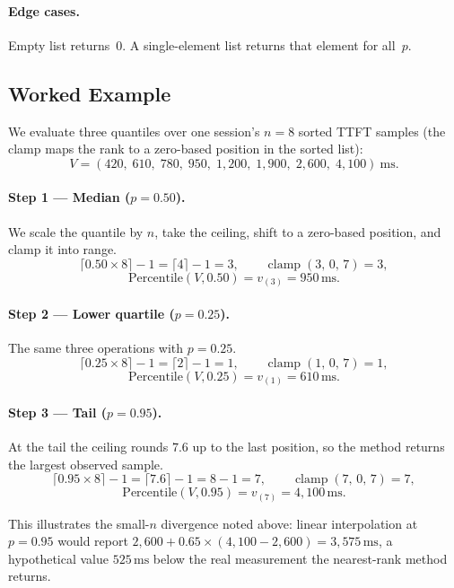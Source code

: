 \documentclass[11pt,a4paper]{article}
\newcommand{\clamp}[3]{\operatorname{clamp}\!\left(#1,\,#2,\,#3\right)}
\begin{document}
\paragraph{Edge cases.}
Empty list returns~0.  A single-element list returns that element for all~$p$.

\subsection{Worked Example}
\label{sec:percentile-example}

We evaluate three quantiles over one session's $n = 8$ sorted TTFT
samples (the clamp maps the rank to a zero-based position in the sorted
list):
\[
  V = (420,\; 610,\; 780,\; 950,\; 1{,}200,\; 1{,}900,\; 2{,}600,\; 4{,}100)\ \text{ms}.
\]

\paragraph{Step 1 --- Median ($p = 0.50$).}
We scale the quantile by $n$, take the ceiling, shift to a zero-based
position, and clamp it into range.
\[
  \lceil 0.50 \times 8 \rceil - 1 = \lceil 4 \rceil - 1 = 3,
  \qquad
  \clamp{3}{0}{7} = 3,
\]
\[
  \text{Percentile}(V, 0.50) = v_{(3)} = 950\,\text{ms}.
\]

\paragraph{Step 2 --- Lower quartile ($p = 0.25$).}
The same three operations with $p = 0.25$.
\[
  \lceil 0.25 \times 8 \rceil - 1 = \lceil 2 \rceil - 1 = 1,
  \qquad
  \clamp{1}{0}{7} = 1,
\]
\[
  \text{Percentile}(V, 0.25) = v_{(1)} = 610\,\text{ms}.
\]

\paragraph{Step 3 --- Tail ($p = 0.95$).}
At the tail the ceiling rounds $7.6$ up to the last position, so the
method returns the largest observed sample.
\[
  \lceil 0.95 \times 8 \rceil - 1 = \lceil 7.6 \rceil - 1 = 8 - 1 = 7,
  \qquad
  \clamp{7}{0}{7} = 7,
\]
\[
  \text{Percentile}(V, 0.95) = v_{(7)} = 4{,}100\,\text{ms}.
\]

This illustrates the small-$n$ divergence noted above: linear
interpolation at $p = 0.95$ would report
$2{,}600 + 0.65 \times (4{,}100 - 2{,}600) = 3{,}575\,\text{ms}$, a
hypothetical value $525\,\text{ms}$ below the real measurement the
nearest-rank method returns.
\end{document}
